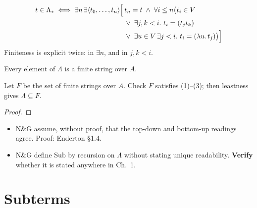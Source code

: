 \documentclass[11pt]{article}
\newcommand{\Lam}{\Lambda}
\newcommand{\Var}{V}
\begin{document}
\begin{quantified}
\[
\begin{aligned}
t \in \Lam_* \iff \exists n\, \exists \seq{t_0,\dots,t_n}
\Bigl[\, & t_n = t \;\land\; \forall i \le n \bigl( t_i \in \Var \\
& \lor\; \exists j,k < i.\ t_i = (t_j t_k) \\
& \lor\; \exists u \in \Var\, \exists j < i.\ t_i = (\lambda u.\, t_j)
\bigr) \Bigr]
\end{aligned}
\]
Finiteness is explicit twice: in $\exists n$, and in $j,k < i$.
\end{quantified}

\begin{theorem}\label{thm:lambda-terms-finite}
Every element of $\Lam$ is a finite string over $A$.
\end{theorem}

\begin{remark}
Let $F$ be the set of finite strings over $A$. Check $F$ satisfies
(1)--(3); then leastness gives $\Lam \subseteq F$.
\end{remark}

\begin{proof}
\end{proof}

\begin{remark}[Gaps]
\begin{itemize}
  \item N\&G assume, without proof, that the top-down and bottom-up readings
        agree. Proof: Enderton \S1.4. 
  \item N\&G define $\mathrm{Sub}$ by recursion on $\Lam$ without stating
        unique readability. \textbf{Verify} whether it is stated anywhere in
        Ch.~1.
\end{itemize}
\end{remark}

\section{Subterms}
\end{document}
